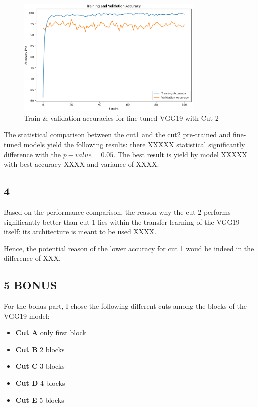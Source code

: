 \documentclass[11pt]{scrartcl}
\begin{document}
\begin{figure}[htbp]
\centering
\includegraphics[width=0.8\textwidth]{./figures/task3-cut2-accuracy.png}
\caption{Train \& validation accuracies for fine-tuned VGG19 with Cut 2}
\label{fig:task3-cut2-accuracy}
\end{figure}


The statistical comparison 
between the cut1 and the cut2 pre-trained and fine-tuned models yield 
the following results:
there XXXXX statistical significantly difference with the \( p-value = 0.05 \).
The best result is yield by model XXXXX with best accuracy XXXX and variance of XXXX.

\subsection*{4}

Based on the performance comparison, 
the reason why the cut 2 performs significantly better than cut 1
lies within the transfer learning of the VGG19 itself:
its architecture is meant to be used XXXX.

Hence, the potential reason of the lower accuracy for cut 1 
woud be indeed in the difference of XXX.

\subsection*{5 BONUS}

For the bonus part, I chose the following different cuts among the blocks
of the VGG19 model:

\begin{itemize}
	\item \textbf{Cut A} only first block
	\item \textbf{Cut B} 2 blocks
	\item \textbf{Cut C} 3 blocks
	\item \textbf{Cut D} 4 blocks
	\item \textbf{Cut E} 5 blocks
\end{itemize}
\end{document}
